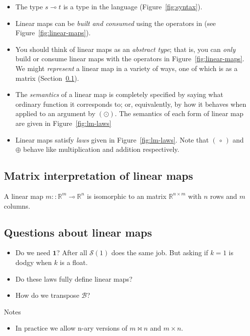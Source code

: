 \documentclass[sigplan,review]{acmart}
\newcommand{\linto}{\multimap}     %
\newcommand{\real}{\mathbb{R}}       %
\newcommand{\lmapply}{\odot}   %
\newcommand{\lmcomp}{\,\circ\,}   %
\newcommand{\lmpair}{\times}         %
\newcommand{\lmjoin}{\bowtie}        %
\newcommand{\lmadd}{\oplus}        %
\newcommand{\lmone}{\mathbf{1}}      %
\newcommand{\lmscalar}[1]{{\mathcal S}(#1)}      %
\newcommand{\lmbuild}{\mathcal B}             %
\begin{document}
\begin{itemize}
\item The type $s \linto t$ is a type in the language (Figure~\ref{fig:syntax}).
\item Linear maps can be \emph{built and consumed} using the
  operators in (see Figure~\ref{fig:linear-maps}).
\item 
  You should think of linear maps as an \emph{abstract type}; that is,
  you can \emph{only} build or consume linear maps with
  the operators in Figure~\ref{fig:linear-maps}.  We might \emph{represent} a linear map in a variety
  of ways, one of which is as a matrix (Section~\ref{sec:matrix-rep}).
  \item The \emph{semantics} of a linear map is completely specified by saying
    what ordinary function it corresponds to; or, equivalently, by how it behaves when applied
    to an argument by $(\lmapply)$.  The semantics of each form of linear map are given in Figure~\ref{fig:lm-laws}
  \item Linear maps satisfy \emph{laws} given in Figure~\ref{fig:lm-laws}.  Note that $(\lmcomp)$ and $\lmadd$ behave
    like multiplication and addition respectively.
\end{itemize}

\subsection{Matrix interpretation of linear maps} \label{sec:matrix-rep}

A linear map $m :: \real^m \linto \real^n$ is isomorphic to an matrix $\real^{n \times m}$ with $n$ rows and $m$ columns.

\subsection{Questions about linear maps}

\begin{itemize}
\item Do we need $\lmone$? After all $\lmscalar{1}$ does the same job.  But asking if $k=1$ is dodgy when $k$ is a float.
\item Do these laws fully define linear maps?
\item How do we transpose $\lmbuild$?
\end{itemize}
Notes
\begin{itemize}
\item In practice we allow n-ary versions of $m \lmjoin n$ and $m \lmpair n$.
\end{itemize}
\end{document}
